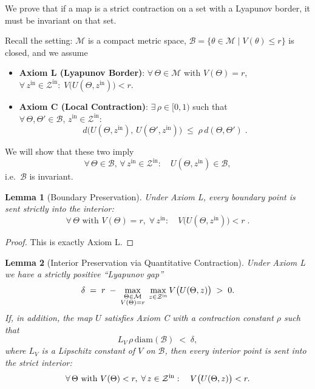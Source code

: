 \documentclass[12pt]{article}
\theoremstyle{definition}
\theoremstyle{plain}
\newtheorem{lemma}{Lemma}[section]
\begin{document}
We prove that if a map is a strict contraction on a set with a Lyapunov border, it must be invariant on that set.


Recall the setting: \(\mathcal{M}\) is a compact metric space, 
\(\mathcal{B}=\{\theta\in\mathcal{M}\mid V(\theta)\le r\}\) is closed, 
and we assume

\begin{itemize}
  \item \textbf{Axiom L (Lyapunov Border)}:
    \(\forall\,\Theta\in\mathcal{M}\) with \(V(\Theta)=r\), 
    \(\forall\,z^{\text{in}}\in\mathcal{Z}^{\text{in}}:\;V\bigl(U(\Theta,z^{\text{in}})\bigr)<r\).
  \item \textbf{Axiom C (Local Contraction)}:
    \(\exists\,\rho\in[0,1)\) such that 
    \(\forall\,\Theta,\Theta'\in\mathcal{B},\,z^{\text{in}}\in\mathcal{Z}^{\text{in}}:\)
    \[
      d\bigl(U(\Theta,z^{\text{in}}),\,U(\Theta',z^{\text{in}})\bigr)\;\le\;\rho\,d(\Theta,\Theta')\;.    
    \]
\end{itemize}

We will show that these two imply
\[
  \forall\,\Theta\in\mathcal{B},\,\forall\,z^{\text{in}}\in\mathcal{Z}^{\text{in}}:\quad
    U(\Theta,z^{\text{in}})\in\mathcal{B},
\]
i.e.\ \(\mathcal{B}\) is invariant.

\begin{lemma}[Boundary Preservation]\label{lem:boundary}
Under Axiom L, every boundary point is sent strictly into the interior:
\[
  \forall\,\Theta\text{ with }V(\Theta)=r,\;\forall\,z^{\text{in}}:\quad
  V\bigl(U(\Theta,z^{\text{in}})\bigr)<r\;.
\]
\end{lemma}
\begin{proof}
This is exactly Axiom L.
\end{proof}

\begin{lemma}[Interior Preservation via Quantitative Contraction]
\label{lem:interior}
Under Axiom L we have a strictly positive “Lyapunov gap”
\[
\delta \;=\;
r \;-\;\max_{\substack{\Theta\in\mathcal M\\V(\Theta)=r}}\;
\max_{z\in\mathcal Z^{\rm in}}
V\bigl(U(\Theta,z)\bigr)
\;>\;0.
\]
If, in addition, the map \(U\) satisfies Axiom C with a contraction constant \(\rho\)
such that
\[
L_V\,\rho\,\mathrm{diam}(\mathcal B)\;<\;\delta,
\]
where \(L_V\) is a Lipschitz constant of \(V\) on \(\mathcal B\), then every interior point is sent into the strict interior:
\[
\forall\,\Theta\text{ with }V(\Theta)<r,\;\forall\,z\in\mathcal Z^{\rm in}:
\quad
V\bigl(U(\Theta,z)\bigr)<r.
\]
\end{lemma}
\end{document}
